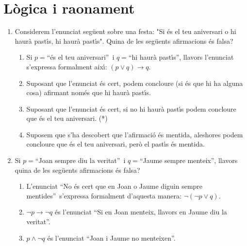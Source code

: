 

\section{Lògica i raonament}

\begin{enumerate}
\item Considerem l'enunciat seg\"{u}ent sobre una festa: "Si \'{e}s el teu
aniversari o hi haur\`{a} past\'{\i}s, hi haur\`{a} past\'{\i}s". Quina de les
seg\"{u}ents afirmacions \'{e}s falsa?

\begin{enumerate}
\item Si $p=$\textquotedblleft\'{e}s el teu aniversari\textquotedblright\ i
$q=$\textquotedblleft hi haur\`{a} past\'{\i}s\textquotedblright, llavors
l'enunciat s'expressa formalment aix\'{\i}: $\left(  p\vee q\right)
\longrightarrow q$.

\item Suposant que l'enunciat \'{e}s cert, podem concloure (si \'{e}s que hi
ha alguna cosa) afirmant nom\'{e}s que hi haur\`{a} past\'{\i}s.

\item Suposant que l'enunciat \'{e}s cert, si no hi haur\`{a} past\'{\i}s
podem concloure que \'{e}s el teu aniversari. (*)

\item Suposem que s'ha descobert que l'afirmaci\'{o} \'{e}s mentida, aleshores
podem concloure que \'{e}s el teu aniversari, per\`{o} el past\'{\i}s \'{e}s mentida.
\end{enumerate}

\item Si $p=$\textquotedblleft Joan sempre diu la veritat\textquotedblright\ i
$q=$\textquotedblleft Jaume sempre menteix\textquotedblright, llavors quina de
les seg\"{u}ents afirmacions \'{e}s falsa?

\begin{enumerate}
\item L'enunciat \textquotedblleft No \'{e}s cert que en Joan o Jaume diguin
sempre mentides\textquotedblright\ s'expressa formalment d'aquesta manera:
$\lnot\left(  \lnot p\vee q\right)  $.

\item $\lnot p\longrightarrow\lnot q$ \'{e}s l'enunciat \textquotedblleft Si
en Joan menteix, llavors en Jaume diu la veritat\textquotedblright.

\item $p\wedge\lnot q$ \'{e}s l'enunciat \textquotedblleft Joan i Jaume no
menteixen\textquotedblright.


\end{enumerate}
\end{enumerate}
